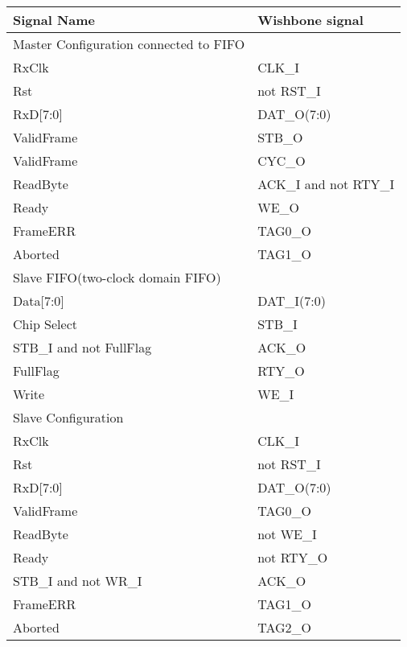 \documentclass[a4paper,11pt]{article}
\begin{document}
\begin{tabular}{|l|l|}
\hline
Signal Name& Wishbone signal\\
\hline
\hline
Master Configuration connected to FIFO&\\
\hline
RxClk & CLK\_I\\
Rst & not RST\_I\\
RxD[7:0]& DAT\_O(7:0)\\
ValidFrame& STB\_O\\
ValidFrame& CYC\_O\\
ReadByte& ACK\_I and not RTY\_I\\
Ready& WE\_O\\
FrameERR& TAG0\_O\\
Aborted& TAG1\_O\\
\hline
Slave FIFO(two-clock domain FIFO)&\\
\hline
Data[7:0]& DAT\_I(7:0)\\
Chip Select& STB\_I\\
STB\_I and not FullFlag& ACK\_O\\
FullFlag& RTY\_O\\
Write& WE\_I\\
\hline
Slave Configuration &\\
\hline
RxClk & CLK\_I\\
Rst & not RST\_I\\
RxD[7:0]& DAT\_O(7:0)\\
ValidFrame& TAG0\_O\\
ReadByte& not WE\_I\\
Ready& not RTY\_O\\
STB\_I and not WR\_I& ACK\_O\\
FrameERR& TAG1\_O\\
Aborted& TAG2\_O\\
\hline
\end{tabular}
 
 
\end{document}
